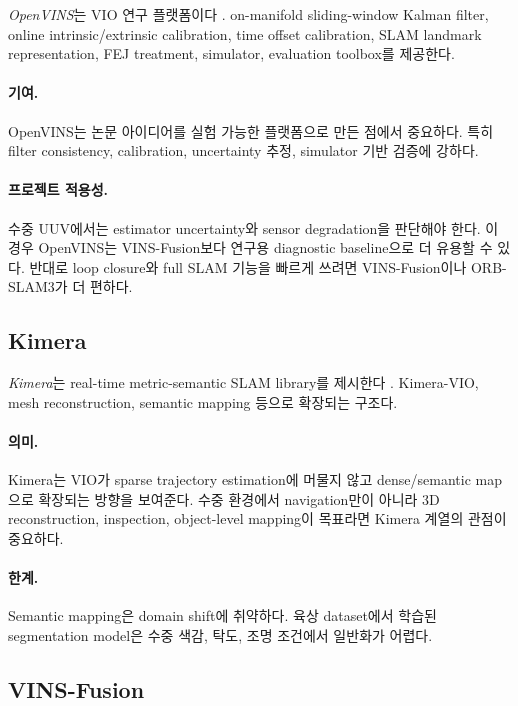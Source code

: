\documentclass[11pt,a4paper]{article}
\newcommand{\paper}[1]{\textit{#1}}
\begin{document}
\paper{OpenVINS}는 VIO 연구 플랫폼이다 \cite{geneva2020openvins}.
on-manifold sliding-window Kalman filter, online intrinsic/extrinsic calibration, time offset calibration, SLAM landmark representation, FEJ treatment, simulator, evaluation toolbox를 제공한다.

\paragraph{기여.}
OpenVINS는 논문 아이디어를 실험 가능한 플랫폼으로 만든 점에서 중요하다.
특히 filter consistency, calibration, uncertainty 추정, simulator 기반 검증에 강하다.

\paragraph{프로젝트 적용성.}
수중 UUV에서는 estimator uncertainty와 sensor degradation을 판단해야 한다.
이 경우 OpenVINS는 VINS-Fusion보다 연구용 diagnostic baseline으로 더 유용할 수 있다.
반대로 loop closure와 full SLAM 기능을 빠르게 쓰려면 VINS-Fusion이나 ORB-SLAM3가 더 편하다.

\subsection{Kimera}

\paper{Kimera}는 real-time metric-semantic SLAM library를 제시한다 \cite{rosinol2020kimera}.
Kimera-VIO, mesh reconstruction, semantic mapping 등으로 확장되는 구조다.

\paragraph{의미.}
Kimera는 VIO가 sparse trajectory estimation에 머물지 않고 dense/semantic map으로 확장되는 방향을 보여준다.
수중 환경에서 navigation만이 아니라 3D reconstruction, inspection, object-level mapping이 목표라면 Kimera 계열의 관점이 중요하다.

\paragraph{한계.}
Semantic mapping은 domain shift에 취약하다.
육상 dataset에서 학습된 segmentation model은 수중 색감, 탁도, 조명 조건에서 일반화가 어렵다.

\subsection{VINS-Fusion}
\end{document}
